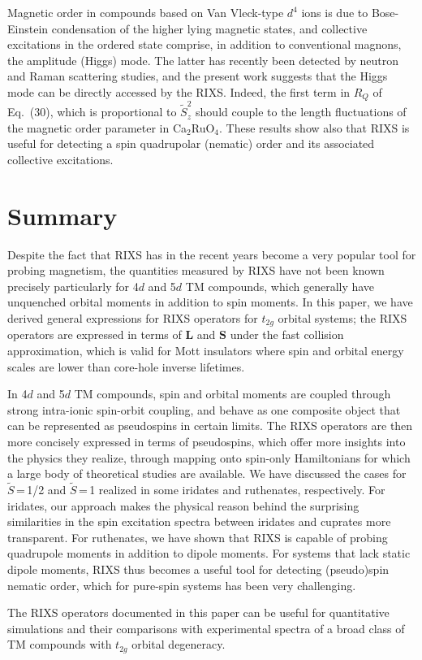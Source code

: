 \documentclass[twocolumn,prb,aps,showpacs,superscriptaddress]{revtex4-1}
\begin{document}
Magnetic order in compounds based on Van Vleck-type $d^4$ ions is due to 
Bose-Einstein condensation of the higher lying magnetic 
states\cite{Khaliullin13}, and collective excitations in the ordered state 
comprise, in addition to conventional magnons, the amplitude (Higgs) mode. 
The latter has recently been detected by neutron\cite{Jai17} and 
Raman\cite{Sou17} scattering studies, and the present work suggests that 
the Higgs mode can be directly accessed by the RIXS. Indeed, the first term 
in $R_Q$ of Eq.~(30), which is proportional to $\tilde{S}_z^2$ should couple 
to the length fluctuations of the magnetic order parameter in Ca$_2$RuO$_4$. 
These results show also that RIXS is useful for detecting a spin quadrupolar 
(nematic) order\cite{Podolsky05} and its associated collective excitations.  

\section{Summary}
Despite the fact that RIXS has in the recent years become a very popular tool
for probing magnetism, the quantities measured by RIXS have not been known
precisely particularly for 4$d$ and 5$d$ TM compounds, which generally have
unquenched orbital moments in addition to spin moments. In this paper, we have
derived general expressions for RIXS operators for $t_{2g}$ orbital systems;
the RIXS operators are expressed in terms of $\mathbf{L}$ and $\mathbf{S}$
under the fast collision approximation, which is valid for Mott insulators
where spin and orbital energy scales are lower than core-hole inverse
lifetimes.

In 4$d$ and 5$d$ TM compounds, spin and orbital moments are coupled through
strong intra-ionic spin-orbit coupling, and behave as one composite object
that can be represented as pseudospins in certain limits. The RIXS operators
are then more concisely expressed in terms of pseudospins, which offer more
insights into the physics they realize, through mapping onto spin-only
Hamiltonians for which a large body of theoretical studies are available. We
have discussed the cases for $\tilde{S}$\,=\,1/2 and $\tilde{S}$\,=\,1
realized in some iridates and ruthenates, respectively. For iridates, our
approach makes the physical reason behind the surprising similarities in the
spin excitation spectra between iridates and cuprates more transparent. For
ruthenates, we have shown that RIXS is capable of probing quadrupole moments
in addition to dipole moments. For systems that lack static dipole moments,
RIXS thus becomes a useful tool for detecting (pseudo)spin nematic order,
which for pure-spin systems has been very challenging.   

The RIXS operators documented in this paper can be useful for quantitative
simulations and their comparisons with experimental spectra of a broad class
of TM compounds with $t_{2g}$ orbital degeneracy. 



\end{document}
